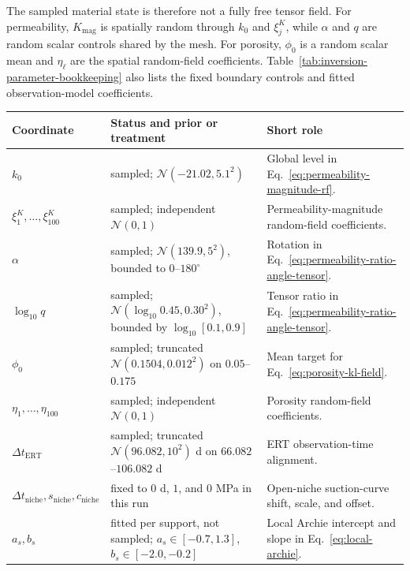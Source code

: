 The sampled material state is therefore not a fully free tensor field.  For
permeability, \(K_{\mathrm{mag}}\) is spatially random through \(k_0\) and
\(\xi^K_j\), while \(\alpha\) and \(q\) are random scalar controls shared by the
mesh.  For porosity, \(\phi_0\) is a random scalar mean and \(\eta_\ell\) are the
spatial random-field coefficients.  Table~\ref{tab:inversion-parameter-bookkeeping}
also lists the fixed boundary controls and fitted observation-model coefficients.

\begingroup
\small
\setlength{\tabcolsep}{3pt}
\renewcommand{\arraystretch}{1.12}
\begin{center}
\label{tab:inversion-parameter-bookkeeping}
\begin{tabular}{@{}L{0.24\textwidth} L{0.33\textwidth} L{0.33\textwidth}@{}}
\toprule
Coordinate & Status and prior or treatment & Short role\\
\midrule
\(k_0\) & sampled; \(\mathcal N(-21.02,5.1^2)\) &
Global level in Eq.~\eqref{eq:permeability-magnitude-rf}.\\
\(\xi^K_1,\ldots,\xi^K_{100}\) & sampled; independent \(\mathcal N(0,1)\) &
Permeability-magnitude random-field coefficients.\\
\(\alpha\) & sampled; \(\mathcal N(139.9,5^2)\), bounded to
\(0\)--\(180^\circ\) &
Rotation in Eq.~\eqref{eq:permeability-ratio-angle-tensor}.\\
\(\log_{10}q\) & sampled; \(\mathcal N(\log_{10}0.45,0.30^2)\), bounded by
\(\log_{10}[0.1,0.9]\) &
Tensor ratio in Eq.~\eqref{eq:permeability-ratio-angle-tensor}.\\
\(\phi_0\) & sampled; truncated \(\mathcal N(0.1504,0.012^2)\) on
\(0.05\)--\(0.175\) &
Mean target for Eq.~\eqref{eq:porosity-kl-field}.\\
\(\eta_1,\ldots,\eta_{100}\) & sampled; independent \(\mathcal N(0,1)\) &
Porosity random-field coefficients.\\
\(\Delta t_{\mathrm{ERT}}\) & sampled; truncated \(\mathcal N(96.082,10^2)\) d on
\(66.082\)--\(106.082\) d &
ERT observation-time alignment.\\
\(\Delta t_{\mathrm{niche}},s_{\mathrm{niche}},c_{\mathrm{niche}}\) &
fixed to \(0\) d, \(1\), and \(0\) MPa in this run &
Open-niche suction-curve shift, scale, and offset.\\
\(a_s,b_s\) & fitted per support, not sampled; \(a_s\in[-0.7,1.3]\),
\(b_s\in[-2.0,-0.2]\) &
Local Archie intercept and slope in Eq.~\eqref{eq:local-archie}.\\
\bottomrule
\end{tabular}
\end{center}
\endgroup

